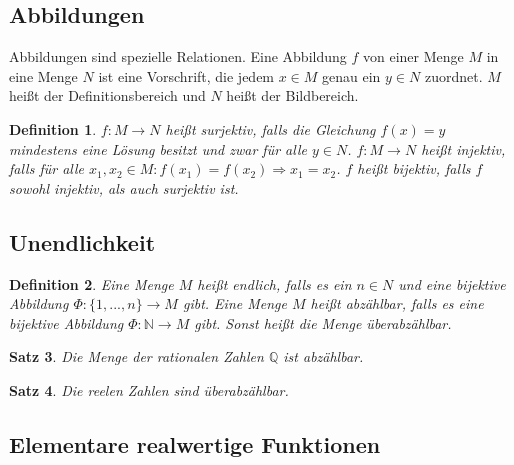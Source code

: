 \documentclass[12pt,a4paper]{report}%
\newtheorem{satz}{Satz}[section]
\newtheorem{definition}[satz]{Definition}
\numberwithin{equation}{section}
\newcommand{\N}{\mathbb{N}}
\newcommand{\Q}{\mathbb{Q}}
\numberwithin{equation}{subsection}
\begin{document}
	\subsection{Abbildungen}
	Abbildungen sind spezielle Relationen. Eine Abbildung $f$ von einer Menge $M$ in eine Menge $N$ ist eine Vorschrift, die jedem $x \in M$ genau ein $y \in N$ zuordnet. $M$ heißt der Definitionsbereich und $N$ heißt der Bildbereich. 
	\begin{definition}
	  $f: M\rightarrow N$ heißt surjektiv, falls die Gleichung $f(x) = y$ mindestens eine Lösung besitzt und zwar für alle $y \in N$.\newline
	  $f:M\rightarrow N$ heißt injektiv, falls für alle $x_1, x_2 \in M: f(x_1) = f(x_2) \Rightarrow x_1 = x_2$.\newline
	  $f$ heißt bijektiv, falls $f$ sowohl injektiv, als auch surjektiv ist.
	\end{definition}
	\subsection{Unendlichkeit}
	\begin{definition}
	  Eine Menge $M$ heißt endlich, falls es ein $n \in N$ und eine bijektive Abbildung $\Phi: \lbrace 1,...,n\rbrace \rightarrow M$ gibt. Eine Menge $M$ heißt abzählbar, falls es eine bijektive Abbildung $\Phi: \N \rightarrow M$ gibt. Sonst heißt die Menge überabzählbar.
	\end{definition}
	\begin{satz}
	  Die Menge der rationalen Zahlen $\Q$ ist abzählbar.
	\end{satz}
	\begin{satz}
	  Die reelen Zahlen sind überabzählbar.
	\end{satz}
	
	\subsection{Elementare realwertige Funktionen}
\end{document}
